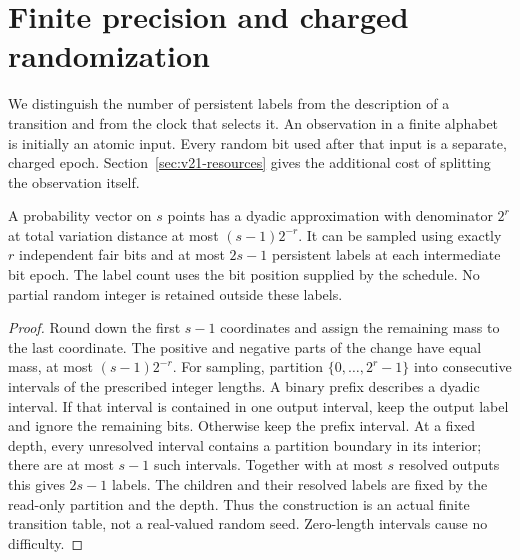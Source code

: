\section{Finite precision and charged randomization}
\label{sec:v21-precision}
We distinguish the number of persistent labels from the description of a
transition and from the clock that selects it. An observation in a finite
alphabet is initially an atomic input. Every random bit used after that
input is a separate, charged epoch. Section~\ref{sec:v21-resources}
gives the additional cost of splitting the observation itself.

\begin{lemma}\label{lem:v21-dyadic}
A probability vector on $s$ points has a dyadic approximation with
denominator $2^r$ at total variation distance at most $(s-1)2^{-r}$.
It can be sampled using exactly $r$ independent fair bits and at most
$2s-1$ persistent labels at each intermediate bit epoch. The label count
uses the bit position supplied by the schedule. No partial random integer
is retained outside these labels.
\end{lemma}
\begin{proof}
Round down the first $s-1$ coordinates and assign the remaining mass to
the last coordinate. The positive and negative parts of the change have
equal mass, at most $(s-1)2^{-r}$. For sampling, partition
$\{0,\ldots,2^r-1\}$ into consecutive intervals of the prescribed integer
lengths. A binary prefix describes a dyadic interval. If that interval is
contained in one output interval, keep the output label and ignore the
remaining bits. Otherwise keep the prefix interval. At a fixed depth,
every unresolved interval contains a partition boundary in its interior;
there are at most $s-1$ such intervals. Together with at most $s$ resolved
outputs this gives $2s-1$ labels. The children and their resolved labels
are fixed by the read-only partition and the depth. Thus the construction
is an actual finite transition table, not a real-valued random seed.
Zero-length intervals cause no difficulty.
\end{proof}

